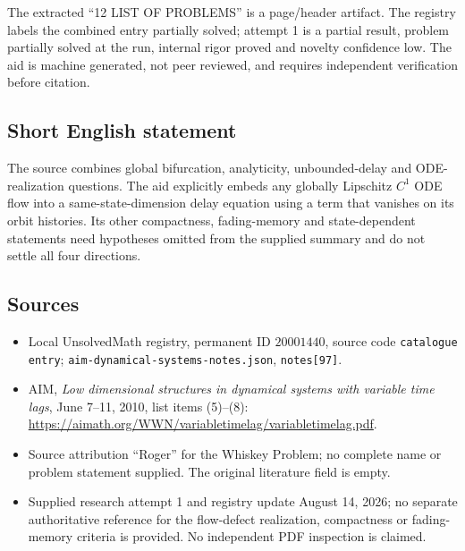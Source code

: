 \documentclass[11pt]{article}
\begin{document}
The extracted ``12 LIST OF PROBLEMS'' is a page/header artifact. The registry labels the combined entry partially solved; attempt 1 is a partial result, problem partially solved at the run, internal rigor proved and novelty confidence low. The aid is machine generated, not peer reviewed, and requires independent verification before citation.
\subsection{Short English statement}
The source combines global bifurcation, analyticity, unbounded-delay and ODE-realization questions. The aid explicitly embeds any globally Lipschitz \(C^1\) ODE flow into a same-state-dimension delay equation using a term that vanishes on its orbit histories. Its other compactness, fading-memory and state-dependent statements need hypotheses omitted from the supplied summary and do not settle all four directions.
\subsection{Sources}
\begin{itemize}
\item Local UnsolvedMath registry, permanent ID \(20001440\), source code \texttt{catalogue entry}; \texttt{aim-dynamical-systems-notes.json}, \texttt{notes[97]}.
\item AIM, \emph{Low dimensional structures in dynamical systems with variable time lags}, June 7--11, 2010, list items (5)--(8): \url{https://aimath.org/WWN/variabletimelag/variabletimelag.pdf}.
\item Source attribution ``Roger'' for the Whiskey Problem; no complete name or problem statement supplied. The original literature field is empty.
\item Supplied research attempt 1 and registry update August 14, 2026; no separate authoritative reference for the flow-defect realization, compactness or fading-memory criteria is provided. No independent PDF inspection is claimed.
\end{itemize}
\end{document}
